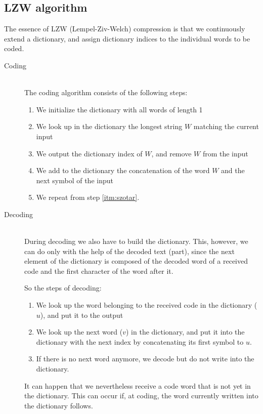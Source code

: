 \documentclass[margin=0px]{article}
\begin{document}
\subsection{LZW algorithm}
The essence of LZW (Lempel-Ziv-Welch) compression is that we continuously extend a dictionary, and assign dictionary indices to the individual words to be coded.
\begin{description}
    \item[Coding] \hfill \\
        The coding algorithm consists of the following steps:
        \begin{enumerate}
            \item We initialize the dictionary with all words of length 1
            \item \label{itm:szotar} We look up in the dictionary the longest string $W$ matching the current input
            \item We output the dictionary index of $W$, and remove $W$ from the input
            \item We add to the dictionary the concatenation of the word $W$ and the next symbol of the input
            \item We repeat from step \ref{itm:szotar}.
        \end{enumerate}
    \item[Decoding] \hfill \\
        During decoding we also have to build the dictionary. This, however, we can do only with the help of the decoded text (part), since the next element of the dictionary is composed of the decoded word of a received code and the first character of the word after it.

        So the steps of decoding:
        \begin{enumerate}
            \item We look up the word belonging to the received code in the dictionary ($u$), and put it to the output
            \item We look up the next word ($v$) in the dictionary, and put it into the dictionary with the next index by concatenating its first symbol to $u$.
            \item If there is no next word anymore, we decode but do not write into the dictionary.
        \end{enumerate}

        It can happen that we nevertheless receive a code word that is not yet in the dictionary. This can occur if, at coding, the word currently written into the dictionary follows.\\


\end{description}
\end{document}
